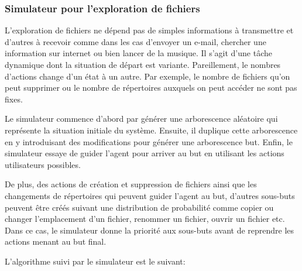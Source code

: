 \subsubsection*{Simulateur pour l'exploration de fichiers}
L'exploration de fichiers ne dépend pas de simples informations à transmettre et d'autres à recevoir comme dans les cas d'envoyer un e-mail, chercher une information sur internet ou bien lancer de la musique. Il s'agit d'une tâche dynamique dont la situation de départ est variante. Pareillement, le nombres d'actions change d'un état à un autre. Par exemple, le nombre de fichiers qu'on peut supprimer ou le nombre de répertoires auxquels on peut accéder ne sont pas fixes.
\par Le simulateur commence d'abord par générer une arborescence aléatoire qui représente la situation initiale du système. Ensuite, il duplique cette arborescence en y introduisant des modifications pour générer une arborescence but. Enfin, le simulateur essaye de guider l'agent pour arriver au but en utilisant les actions utilisateurs possibles.
\par De plus, des actions de création et suppression de fichiers ainsi que les changements de répertoires qui peuvent guider l'agent au but, d'autres sous-buts peuvent être créés suivant une distribution de probabilité comme copier ou changer l'emplacement d'un fichier, renommer un fichier, ouvrir un fichier etc. Dans ce cas, le simulateur donne la priorité aux sous-buts avant de reprendre les actions menant au but final.
\par L'algorithme suivi par le simulateur est le suivant:
\makeatletter
\def\BState{\State\hskip-\ALG@thistlm}
\makeatother


